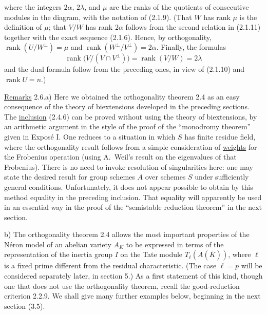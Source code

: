 where the integers $2\alpha$, $2\lambda$, and $\mu$ are the ranks of
the quotients of consecutive modules in the diagram, with the notation
of (2.1.9).  (That $W$ has rank $\mu$ is the definition of $\mu$; that
$V/W$ has rank $2\alpha$ follows from the second relation in (2.1.11)
together with the exact sequence (2.1.6).  Hence, by orthogonality,
$\operatorname{rank}(U/W^\perp)=\mu$ and
$\operatorname{rank}(W^\perp/V^\perp)=2\alpha$.  Finally, the formulas
\begin{equation}\tag{2.5.5}
 \operatorname{rank}\bigl(V/(V\cap V^\perp)\bigr)
 =\operatorname{rank}(V/W)=2\lambda
\end{equation}
and the dual formula follow from the preceding ones, in view of
(2.1.10) and $\operatorname{rank}U=n$.)

\medskip
\noindent
\underline{Remarks} 2.6.\quad a) Here we obtained the orthogonality
theorem 2.4 as an easy consequence of the theory of biextensions
developed in the preceding sections.  The \underline{inclusion}
(2.4.6) can be proved without using the theory of biextensions, by an
arithmetic argument in the style of the proof of the ``monodromy
theorem'' given in Expos\'e I.  One reduces to a situation in which $S$
has finite residue field, where the orthogonality result follows from a
simple consideration of \underline{weights} for the Frobenius operation
(using A.~Weil's result on the eigenvalues of that Frobenius).  There is
no need to invoke resolution of singularities here: one may state the
desired result for group schemes $A$ over schemes $S$ under sufficiently
general conditions.  Unfortunately, it does not appear possible to
obtain by this method equality in the preceding inclusion.  That
equality will apparently be used in an essential way in the proof of
the ``semistable reduction theorem'' in the next section.

\smallskip
\noindent
b) The orthogonality theorem 2.4 allows the most important properties
of the N\'{e}ron model of an abelian variety $A_K$ to be expressed in
terms of the representation of the inertia group $I$ on the Tate module
$T_\ell(A(\overline K))$, where $\ell$ is a fixed prime different from
the residual characteristic.  (The case $\ell=p$ will be considered
separately later, in section 5.)  As a first statement of this kind,
though one that does not use the orthogonality theorem, recall the
good-reduction criterion 2.2.9.  We shall give many further examples
below, beginning in the next section (3.5).
